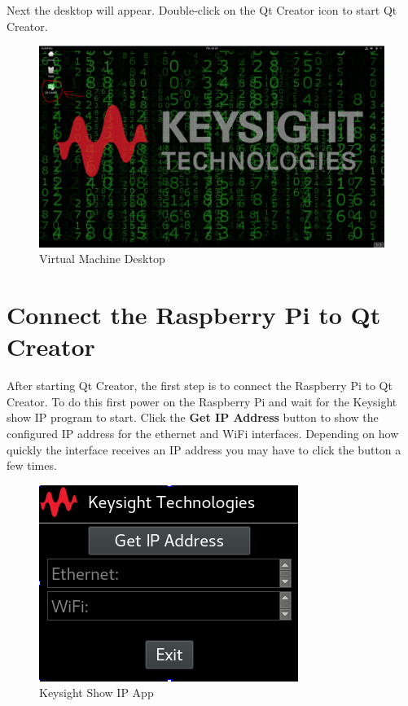 \documentclass{article}
\begin{document}
Next the desktop will appear. Double-click on the Qt Creator icon to start Qt Creator.

	\begin{figure}[H]
		\centering
		\includegraphics[scale=0.35]{pics/VM_Desktop.png}
		\caption{Virtual Machine Desktop}
		\label{VM_desktop}
	\end{figure}

\section{Connect the Raspberry Pi to Qt Creator}

After starting Qt Creator, the first step is to connect the Raspberry Pi to Qt Creator. To do this first power on the Raspberry Pi and wait for the Keysight show IP program to start. Click the \textbf{Get IP Address} button to show the configured IP address for the ethernet and WiFi interfaces. Depending on how quickly the interface receives an IP address you may have to click the button a few times.

	\begin{figure}[H]
		\centering
		\includegraphics[scale=0.75]{pics/Show_IP_app.png}
		\caption{Keysight Show IP App}
		\label{Show_IP_app}
	\end{figure}
\end{document}
